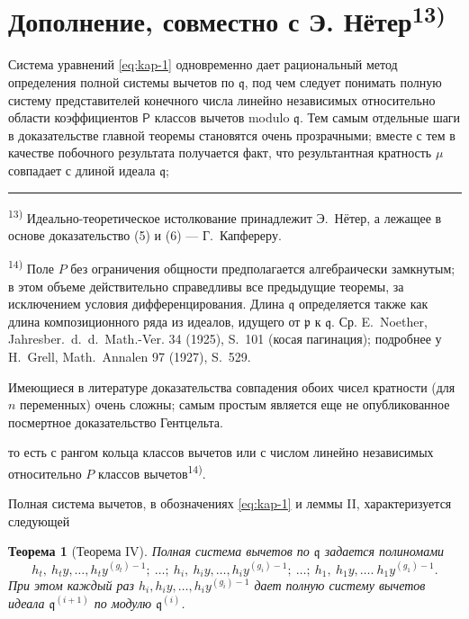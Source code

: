 \documentclass[11pt]{article}
\newcommand{\foreign}[1]{#1}
\theoremstyle{plain}
\newtheorem{satz}{Теорема}
\begin{document}
\newpage
\section*{Дополнение, совместно с Э. Нётер\textsuperscript{13)}}

Система уравнений \eqref{eq:kap-1} одновременно дает рациональный
метод определения полной системы вычетов по $\mathfrak{q}$, под чем
следует понимать полную систему представителей конечного числа
линейно независимых относительно области коэффициентов $\mathsf{P}$ классов
вычетов modulo $\mathfrak{q}$. Тем самым отдельные шаги в
доказательстве главной теоремы становятся очень прозрачными; вместе
с тем в качестве побочного результата получается факт, что
результантная кратность $\mu$ совпадает с длиной идеала
$\mathfrak{q}$;

\vspace{0.5em}
\noindent\rule{\textwidth}{0.4pt}
\vspace{0.3em}

{\footnotesize
\textsuperscript{13)} Идеально-теоретическое истолкование принадлежит
Э.\ Нётер, а лежащее в основе доказательство (5) и (6) --- Г.\ Капфереру.

\textsuperscript{14)} Поле $P$ без ограничения общности предполагается
алгебраически замкнутым; в этом объеме действительно справедливы все
предыдущие теоремы, за исключением условия дифференцирования. Длина
$\mathfrak{q}$ определяется также как длина композиционного ряда из
идеалов, идущего от $\mathfrak{p}$ к $\mathfrak{q}$. Ср. E.\ Noether,
\foreign{Jahresber.\ d.\ d.\ Math.-Ver.} 34 (1925), S.~101
(косая пагинация); подробнее у H.\ Grell, \foreign{Math.\ Annalen} 97
(1927), S.~529.

Имеющиеся в литературе доказательства совпадения обоих чисел
кратности (для $n$ переменных) очень сложны; самым простым является
еще не опубликованное посмертное доказательство Гентцельта.
}

\vspace{1em}
то есть с рангом кольца классов вычетов или с числом линейно
независимых относительно $P$ классов вычетов\textsuperscript{14)}.

Полная система вычетов, в обозначениях \eqref{eq:kap-1} и леммы II,
характеризуется следующей

\begin{satz}[Теорема IV]\label{satz:kap-IV}
Полная система вычетов по $\mathfrak{q}$ задается полиномами
\[
h_{t},\ h_{t}y,\ldots,h_{t}y^{(g_{t})-1};\ \ldots;\
h_{i},\ h_{i}y,\ldots,h_{i}y^{(g_{i})-1};\ \ldots;\
h_{1},\ h_{1}y,\ldots.\ h_{1}y^{(g_{1})-1}.
\]
При этом каждый раз $h_{i}, h_{i}y, \ldots, h_{i}y^{(g_{i})-1}$ дает
полную систему вычетов идеала $\mathfrak{q}^{(i+1)}$ по модулю
$\mathfrak{q}^{(i)}$.
\end{satz}
\end{document}
